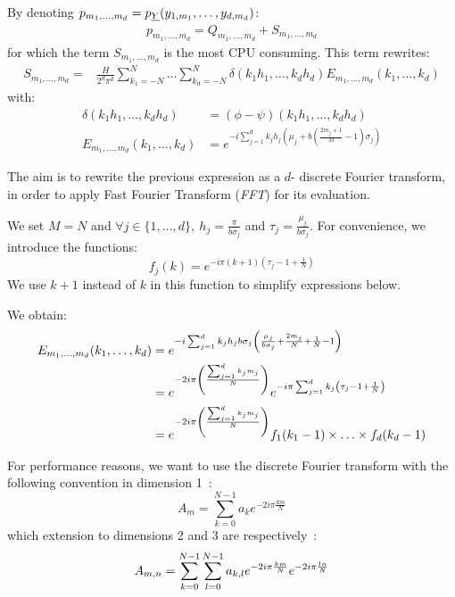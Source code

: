 {  By denoting $p_{m_1,\hdots,m_d}=p_{{\underline{Y}}}(y_{1,m_1},\hdots,y_{d,m_d})$:
  \begin{align}
    p_{m_1,\hdots,m_d}= Q_{m_1,\hdots,m_d}+S_{m_1,\hdots,m_d}
  \end{align}
  for which the term $S_{m_1,\hdots,m_d}$ is the most CPU consuming. This term rewrites:
  \begin{align}
  S_{m_1,\hdots,m_d}=&\frac{H}{2^d\pi^d}\sum_{k_1=-N}^{N}\hdots\sum_{k_d=-N}^{N}\delta\left(k_1h_1,\hdots,k_dh_d\right)
  E_{m_1,\hdots,m_d}(k_1,\hdots,k_d) \label{Eq:S}
  \end{align}
  with:
  \begin{align}
    \delta\left(k_1h_1,\hdots,k_dh_d\right)&=(\phi-\psi)\left(k_1h_1,\hdots,k_dh_d\right)\\
    E_{m_1,\hdots,m_d}(k_1,\hdots,k_d)&=e^{-i\sum_{j=1}^d k_jh_j\left(\mu_j+b\left(\frac{2m_j+1}{M}-1\right)\sigma_j\right)}
  \end{align}

  The aim is to rewrite the previous expression as a $d$- discrete Fourier transform, in order to apply Fast Fourier Transform (\emph{FFT}) for its evaluation.

  We set $M=N$ and $\forall j \in\{1,\hdots,d\},\: h_j=\frac{\pi}{b\sigma_j}$ and $\tau_j=\frac{\mu_j}{b\sigma_j}$.
  For convenience, we introduce the functions:
  $$
  f_j(k) = e^{-i\pi (k+1)\left(\tau_j-1+\frac{1}{N}\right)}
  $$
  We use $k+1$ instead of $k$ in this function to simplify expressions below.

  We obtain:
  \begin{align}
  E_{m_1,\hdots,m_d}(k_1,\hdots,k_d)&=e^{-i\sum_{j=1}^{d} k_jh_jb\sigma_j\left(\frac{\mu_j}{b\sigma_j}+\frac{2m_j}{N}+\frac{1}{N}-1\right)}\notag\\
    &=e^{-2i\pi\left(\frac{\sum_{j=1}^{d}k_j m_j}{N}\right)}e^{-i\pi\sum_{j=1}^{d} k_j\left(\tau_j-1+\frac{1}{N}\right)} \notag\\
    &=e^{-2i\pi\left(\frac{\sum_{j=1}^{d}k_j m_j}{N}\right)} f_1(k_1-1) \times\hdots\times f_d(k_d-1) \label{Eq:E}
  \end{align}

  For performance reasons, we want to use the discrete Fourier transform with the following convention in dimension 1~:
  $$
  A_m = \sum_{k=0}^{N-1} a_k e^{-2i\pi\frac{km}{N}}
  $$
  which extension to dimensions 2 and 3 are respectively~:
  $$
  A_{m,n} = \sum_{k=0}^{N-1}\sum_{l=0}^{N-1} a_{k,l} e^{-2i\pi\frac{km}{N}} e^{-2i\pi\frac{ln}{N}}\\
  $$

}
